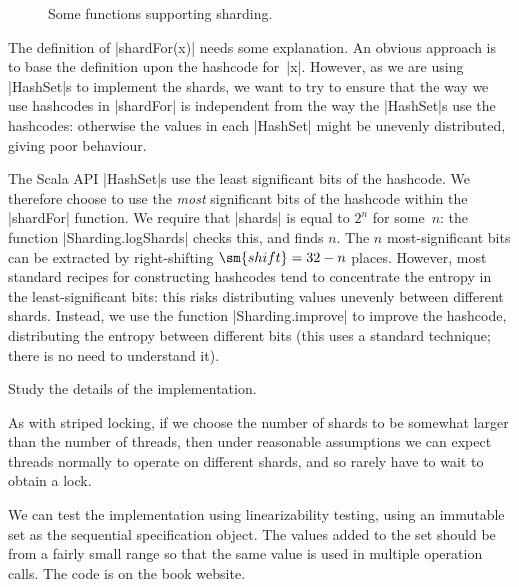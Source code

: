 \begin{figure}
\caption{Some functions supporting sharding.}
\label{fig:Sharding}
\end{figure}


The definition of |shardFor(x)| needs some explanation.  An obvious approach
is to base the definition upon the hashcode for~|x|.  However, as we are using
|HashSet|s to implement the shards, we want to try to ensure that the way we
use hashcodes in |shardFor| is independent from the way the |HashSet|s use the
hashcodes: otherwise the values in each |HashSet| might be unevenly
distributed, giving poor behaviour.

The Scala API |HashSet|s use the least significant bits of the hashcode.  We
therefore choose to use the \emph{most} significant bits of the hashcode
within the |shardFor| function.  We require that |shards| is equal to $2^n$
for some~$n$: the function |Sharding.logShards| checks this, and finds $n$.
The $n$ most-significant bits can be extracted by right-shifting $\sm{shift} =
32-n$ places.  However, most standard recipes for constructing hashcodes tend
to concentrate the entropy in the least-significant bits: this risks
distributing values unevenly between different shards.  Instead, we use the
function |Sharding.improve| to improve the hashcode, distributing the entropy
between different bits (this uses a standard technique; there is no need to
understand it).

\begin{instruction}
Study the details of the implementation.
\end{instruction}

As with striped locking, if we choose the number of shards to be somewhat
larger than the number of threads, then under reasonable assumptions we can
expect threads normally to operate on different shards, and so rarely have to
wait to obtain a lock.

We can test the implementation using linearizability testing, using an
immutable set as the sequential specification object.  The values added to the
set should be from a fairly small range so that the same value is used in
multiple operation calls.  The code is on the book website.


